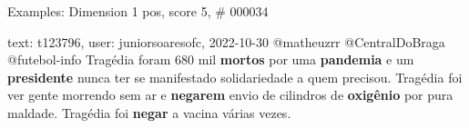 \begin{frame}{Examples: Dimension 1 pos, score 5, \# 000034}
\footnotesize
\begin{exampleblock}{text: t123796, user: juniorsoaresofc, 2022-10-30}
@matheuzrr @CentralDoBraga @futebol-info Tragédia foram 680 mil \textbf{mortos} 
por uma \textbf{pandemia} e um \textbf{presidente} nunca ter se manifestado 
solidariedade a quem precisou. Tragédia foi ver gente morrendo sem ar e 
\textbf{negarem} envio de cilindros de \textbf{oxigênio} por pura maldade. 
Tragédia foi \textbf{negar} a vacina várias vezes. 
\end{exampleblock}
\end{frame}
